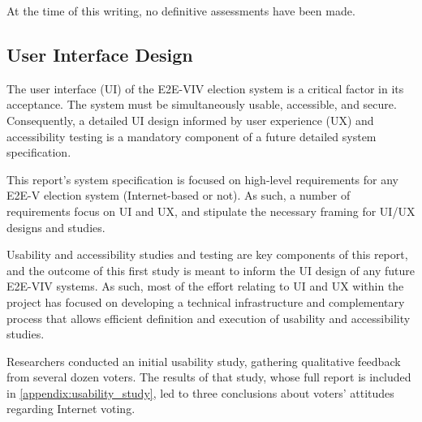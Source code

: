 At the time of this writing, no definitive assessments have been
made. 

\subsection{User Interface Design}
\label{sec:user-interf-design}

The user interface (UI) of the E2E-VIV election system is a critical
factor in its acceptance. The system must be simultaneously usable,
accessible, and secure. Consequently, a detailed UI design informed by
user experience (UX) and accessibility testing is a mandatory
component of a future detailed system specification.

This report’s system specification is focused on high-level
requirements for any E2E-V election system (Internet-based or not). As
such, a number of requirements focus on UI and UX, and stipulate the
necessary framing for UI/UX designs and studies.

Usability and accessibility studies and testing are key components of
this report, and the outcome of this first study is meant to inform
the UI design of any future E2E-VIV systems. As such, most of the
effort relating to UI and UX within the project has focused on
developing a technical infrastructure and complementary process that
allows efficient definition and execution of usability and
accessibility studies.

Researchers conducted an initial usability study, gathering
qualitative feedback from several dozen voters. The results of that
study, whose full report is included in
\autoref{appendix:usability_study}, led to three conclusions about
voters’ attitudes regarding Internet voting.

